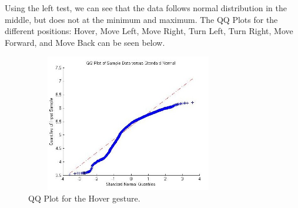 \documentclass[letterpaper,english, 12pt]{article}
\begin{document}
Using the left test, we can see that the data follows normal distribution in the middle, but does not at the minimum and maximum.  The QQ Plots for the different positions: Hover, Move Left, Move Right, Turn Left, Turn Right, Move Forward, and Move Back can be seen below.  

\begin{figure}[H]
	\centering
	\includegraphics[height=6cm,width=90mm]{pics/qqHover.jpg}
	\caption{QQ Plot for the Hover gesture.}
\end{figure}

\begin{figure}[H]
\centering
{}
	\hspace{0.5cm}
\end{figure}
\end{document}
